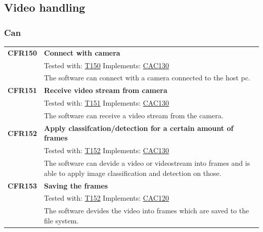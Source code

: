 \documentclass[parskip=full]{scrartcl}
\begin{document}
\subsection{Video handling}
\subsubsection{Can}
\begin{tabular}{p{2cm}p{11.4cm}}
\textbf{CFR150} \hypertarget{CFR150} & \textbf{Connect with camera}\\
& Tested with: \hyperlink{T150}{T150} Implements: \hyperlink{CAC130}{CAC130} \\
& The software can connect with a camera connected to the \gls{host pc}.\\
\textbf{CFR151} \hypertarget{CFR151} & \textbf{Receive video stream from camera}\\
& Tested with: \hyperlink{T151}{T151} Implements: \hyperlink{CAC130}{CAC130}\\
& The software can receive a video stream from the camera.\\
\textbf{CFR152} \hypertarget{CFR152} & \textbf{Apply classifcation/detection for a certain amount of frames}\\
& Tested with: \hyperlink{T152}{T152} Implements: \hyperlink{CAC130}{CAC130}\\
& The software can devide a video or videostream into frames and is able to apply \gls{image classification} and detection on those.\\
\textbf{CFR153} \hypertarget{CFR153} & \textbf{Saving the frames}\\
& Tested with: \hyperlink{T152}{T152} Implements: \hyperlink{CAC120}{CAC120}\\
& The software devides the video into frames which are saved to the file system.
\end{tabular}
\end{document}
